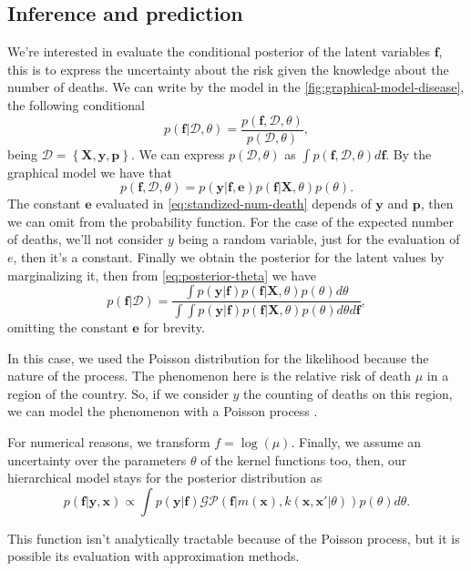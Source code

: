\subsection{Inference and prediction}

We're interested in evaluate the conditional posterior of the latent variables $\mathbf{f}$, this is to express the uncertainty about the risk given the knowledge about the number of deaths. We can write by the model in the \autoref{fig:graphical-model-disease}, the following conditional
%
\begin{equation}
    p(\mathbf{f}|\mathcal{D},\theta) = \frac{p(\mathbf{f},\mathcal{D},\theta)}{p(\mathcal{D},\theta)},
    \label{eq:posterior-theta}
\end{equation}
%
being $\mathcal{D}=\left\{ \mathbf{X},\mathbf{y}, \mathbf{p} \right\}$. We can express $p(\mathcal{D},\theta)$ as $\int p(\mathbf{f},\mathcal{D},\theta)d\mathbf{f}$. By the graphical model we have that
%
\begin{equation}
    p(\mathbf{f},\mathcal{D},\theta) = p(\mathbf{y}|\mathbf{f},\mathbf{e})p(\mathbf{f}|\mathbf{X},\theta)p(\theta).
\end{equation}
%
The constant $\mathbf{e}$ evaluated in \eqref{eq:standized-num-death} depends of $\mathbf{y}$ and $\mathbf{p}$, then we can omit from the probability function. For the case of the expected number of deaths, we'll not consider $y$ being a random variable, just for the evaluation of $e$, then it's a constant. Finally we obtain the posterior for the latent values by marginalizing it, then from \eqref{eq:posterior-theta} we have
{\color{red}
%
\begin{equation}
    p(\mathbf{f}|\mathcal{D})=\frac{\int p(\mathbf{y}|\mathbf{f})p(\mathbf{f}|\mathbf{X},\theta)p(\theta) d\theta}{\int \int p(\mathbf{y}|\mathbf{f})p(\mathbf{f}|\mathbf{X},\theta)p(\theta) d\theta d\mathbf{f}},
\end{equation}
%
}
omitting the constant $\mathbf{e}$ for brevity.
{\color{red}
%

In this case, we used the Poisson distribution for the likelihood because the nature of the process. The phenomenon here is the relative risk of death $\mu$ in a region of the country. So, if we consider $y$ the counting of deaths on this region, we can model the phenomenon with a Poisson process \cite{Vanhatalo2010Vehtari}.

For numerical reasons, we transform $f=\log(\mu)$. Finally, we assume an uncertainty over the parameters $\theta$ of the kernel functions too, then, our hierarchical model stays for the posterior distribution as 
%
\begin{equation}
    p(\mathbf{f}|\mathbf{y},\mathbf{x}) \propto \int p(\mathbf{y}|\mathbf{f})\mathcal{GP}\left(\mathbf{f} | m(\mathbf{x}),k(\mathbf{x},\mathbf{x}'|\theta) \right)p(\theta) d\theta.
\end{equation}

This function isn't analytically tractable because of the Poisson process, but it is possible its evaluation with approximation methods.

}
